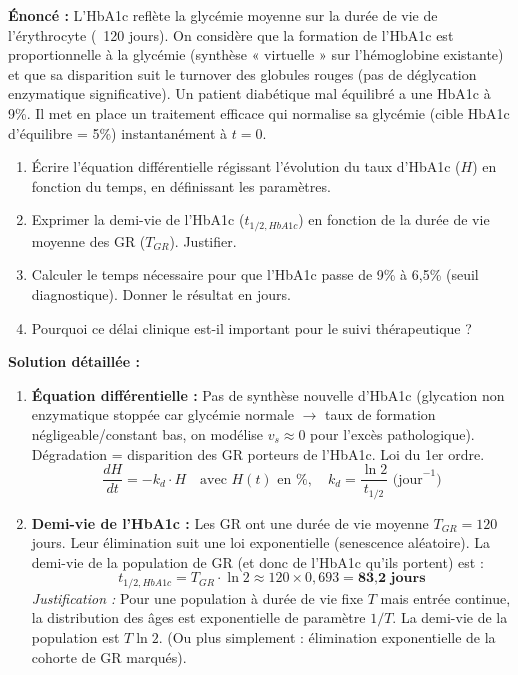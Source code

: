 \documentclass[11pt]{article}
\begin{document}
\begin{exoresolu}
\textbf{Énoncé :} L'HbA1c reflète la glycémie moyenne sur la durée de vie de l'érythrocyte (~120 jours). On considère que la formation de l'HbA1c est proportionnelle à la glycémie (synthèse « virtuelle » sur l'hémoglobine existante) et que sa disparition suit le turnover des globules rouges (pas de déglycation enzymatique significative). Un patient diabétique mal équilibré a une HbA1c à 9\%. Il met en place un traitement efficace qui normalise sa glycémie (cible HbA1c d'équilibre = 5\%) instantanément à $t=0$.
\begin{enumerate}
    \item Écrire l'équation différentielle régissant l'évolution du taux d'HbA1c ($H$) en fonction du temps, en définissant les paramètres.
    \item Exprimer la demi-vie de l'HbA1c ($t_{1/2, HbA1c}$) en fonction de la durée de vie moyenne des GR ($T_{GR}$). Justifier.
    \item Calculer le temps nécessaire pour que l'HbA1c passe de 9\% à 6,5\% (seuil diagnostique). Donner le résultat en jours.
    \item Pourquoi ce délai clinique est-il important pour le suivi thérapeutique ?
\end{enumerate}
\tcblower
\textbf{Solution détaillée :}
\begin{enumerate}
    \item \textbf{Équation différentielle :}
    Pas de synthèse nouvelle d'HbA1c (glycation non enzymatique stoppée car glycémie normale $\rightarrow$ taux de formation négligeable/constant bas, on modélise $v_s \approx 0$ pour l'excès pathologique).
    Dégradation = disparition des GR porteurs de l'HbA1c. Loi du 1er ordre.
    \[ \frac{dH}{dt} = -k_d \cdot H \quad \text{avec } H(t) \text{ en \%}, \quad k_d = \frac{\ln 2}{t_{1/2}} \text{ (jour}^{-1}\text{)} \]
    \item \textbf{Demi-vie de l'HbA1c :}
    Les GR ont une durée de vie moyenne $T_{GR} = 120$ jours. Leur élimination suit une loi exponentielle (senescence aléatoire). La demi-vie de la population de GR (et donc de l'HbA1c qu'ils portent) est :
    \[ t_{1/2, HbA1c} = T_{GR} \cdot \ln 2 \approx 120 \times 0{,}693 = \textbf{83{,}2 jours} \]
    \emph{Justification :} Pour une population à durée de vie fixe $T$ mais entrée continue, la distribution des âges est exponentielle de paramètre $1/T$. La demi-vie de la population est $T \ln 2$. (Ou plus simplement : élimination exponentielle de la cohorte de GR marqués).

\end{enumerate}
\end{exoresolu}
\end{document}
